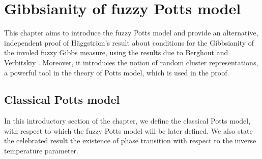 \documentclass[12pt]{article}
\newcommand{\1}{\mathbbm{1}}
\newcommand{\5}{\vspace{0.5cm}}
\theoremstyle{definition}
\begin{document}

\pagebreak


\section{Gibbsianity of fuzzy Potts model}\label{ch:3}

This chapter aims to introduce the fuzzy Potts model and provide an alternative, independent proof of H\"aggstr\"om's result \cite{Hag} about conditions for the Gibbsianity of the involed fuzzy Gibbs measure, using the results due to Berghout and Verbitskiy \cite{Ber}. Moreover, it introduces the notion of random cluster representations, a powerful tool in the theory of Potts model, which is used in the proof.


\subsection{Classical Potts model}

In this introductory section of the chapter, we define the classical Potts model, with respect to which the fuzzy Potts model will be later defined. We also state the celebrated result the existence of phase transition with respect to the inverse temperature parameter. \\
\end{document}
